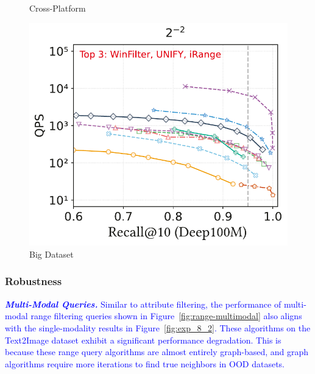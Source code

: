 \documentclass[sigconf, nonacm]{acmart}
\begin{document}
{\begin{figure}
\begin{minipage}[t]{0.39\textwidth}
		\caption{Cross-Platform}
		\label{fig:range-cross-platform}
	\end{minipage}%
	\hfill
	\begin{minipage}[t]{0.203\textwidth}
		\centering
		\includegraphics[width=0.96\linewidth]{figures/exp/range_deep100M.pdf} 
		\caption{Big Dataset}
		\label{fig: range big dataset}
	\end{minipage}
\end{figure}

	
	\subsubsection{Robustness}
	
	\textit{\textbf{\textcolor{blue}{Multi-Modal Queries.}}}
	\textcolor{blue}{
		Similar to attribute filtering, the performance of multi-modal range filtering queries shown in Figure~\ref{fig:range-multimodal} also aligns with the single-modality results in Figure~\ref{fig:exp_8_2}. These algorithms on the Text2Image dataset exhibit a significant performance degradation. This is because these range query algorithms are almost entirely graph-based, and graph algorithms require more iterations to find true neighbors in OOD datasets.
		}
		
}
\end{document}

